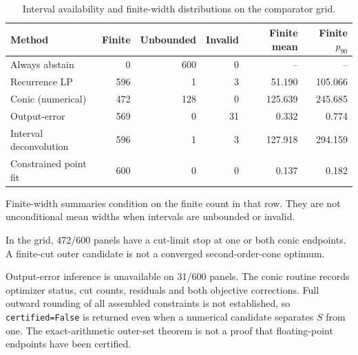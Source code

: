 \documentclass[10pt,twocolumn,letterpaper]{article}
\theoremstyle{definition}
\theoremstyle{remark}
\begin{document}
\begin{table}[htbp]\centering\small
\caption{Interval availability and finite-width distributions on the comparator grid.}
\label{tab:corrective_widths}
\begin{tabular*}{\textwidth}{@{\extracolsep{\fill}}lrrrrr@{}}
\toprule
Method & Finite & Unbounded & Invalid & Finite mean & Finite $p_{90}$ \\
\midrule
Always abstain & 0 & 600 & 0 & -- & -- \\
Recurrence LP & 596 & 1 & 3 & 51.190 & 105.066 \\
Conic (numerical) & 472 & 128 & 0 & 125.639 & 245.685 \\
Output-error & 569 & 0 & 31 & 0.332 & 0.774 \\
Interval deconvolution & 596 & 1 & 3 & 127.918 & 294.159 \\
Constrained point fit & 600 & 0 & 0 & 0.137 & 0.182 \\
\bottomrule\end{tabular*}
\par\smallskip\begin{minipage}{\textwidth}\footnotesize Finite-width summaries condition on the finite count in that row. They are not unconditional mean widths when intervals are unbounded or invalid.\end{minipage}
\end{table}


In the grid, 472/600 panels have a cut-limit stop at one or both conic endpoints. A finite-cut outer candidate is not a converged second-order-cone optimum.


Output-error inference is unavailable on 31/600 panels. The conic routine records optimizer status, cut counts, residuals and both
objective corrections. Full outward rounding of all assembled constraints is
not established, so \texttt{certified=False} is returned even when a numerical
candidate separates $S$ from one. The exact-arithmetic outer-set theorem is
not a proof that floating-point endpoints have been certified.
\end{document}

